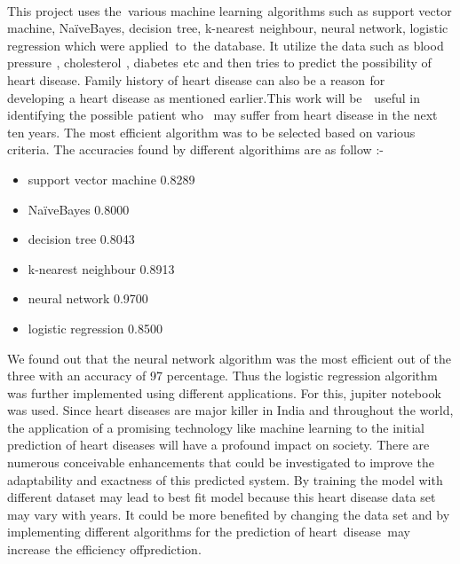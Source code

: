 \documentclass[oneside,12pt]{Classes/VTU}
\begin{document}
	\paragraph{} This project uses the\tiny\textcolor{white}{y}\normalsize various machine learning\tiny\textcolor{white}{s}\normalsize algorithms such as support vector machine, NaïveBayes,   decision\tiny\textcolor{white}{s}\normalsize   tree,  k-nearest\tiny\textcolor{white}{s}\normalsize neighbour, neural network, logistic regression which were applied\tiny\textcolor{white}{d}\normalsize to\tiny\textcolor{white}{o}\normalsize the database.  It  utilize the data such  as blood  pressure\tiny\textcolor{white}{s}\normalsize, cholesterol\tiny\textcolor{white}{s}\normalsize ,  diabetes\tiny\textcolor{white}{s}\normalsize etc and then tries to predict the possibility of heart disease. Family history of heart disease can also\tiny\textcolor{white}{i}\normalsize be a reason\tiny\textcolor{white}{s}\normalsize for developing\tiny\textcolor{white}{s}\normalsize a heart disease as mentioned earlier.This work will be\tiny\textcolor{white}{en}\normalsize useful in identifying the possible\tiny\textcolor{white}{s}\normalsize patient\tiny\textcolor{white}{s}\normalsize who\tiny\textcolor{white}{m}\normalsize may  suffer from heart disease in the next ten years. The most efficient algorithm was to be selected based on various criteria. The accuracies found by different algorithims are as follow :-\\
	\begin{itemize}
		\item support vector machine   0.8289   
		\item  NaïveBayes   0.8000   
		\item decision tree   0.8043
		\item  k-nearest neighbour   0.8913 
		\item neural network   0.9700 
		\item logistic regression 0.8500\\
	\end{itemize}
	We found out that the neural network algorithm was the most efficient out of the three with an accuracy of 97 percentage. Thus the logistic regression algorithm was further implemented using different applications. For this, jupiter notebook was used. Since heart diseases are major killer in India and throughout the world, the application of a promising technology like machine learning to the initial prediction of heart diseases will have a profound impact on society. There are numerous conceivable enhancements that could be investigated to improve the adaptability and exactness of this predicted system. By training the model with different dataset may lead to best fit model because this heart disease data set may vary with years. It could be more benefited by changing the data set and by implementing different algorithms for the prediction of heart\tiny\textcolor{white}{y}\normalsize disease\tiny\textcolor{white}{y}\normalsize may increase\tiny\textcolor{white}{s}\normalsize the efficiency of\tiny\textcolor{white}{f}\normalsize prediction.\\
\end{document}
